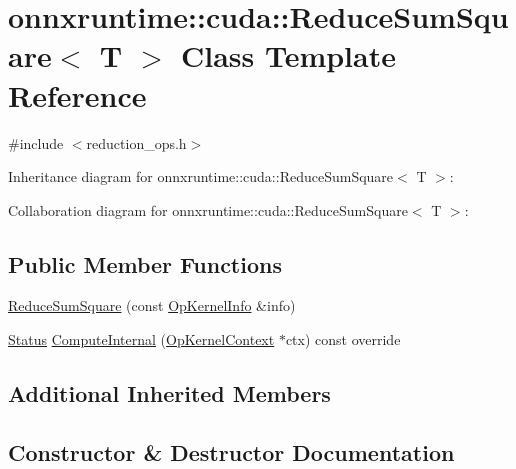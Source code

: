 \hypertarget{classonnxruntime_1_1cuda_1_1ReduceSumSquare}{}\section{onnxruntime\+:\+:cuda\+:\+:Reduce\+Sum\+Square$<$ T $>$ Class Template Reference}
\label{classonnxruntime_1_1cuda_1_1ReduceSumSquare}


{\ttfamily \#include $<$reduction\+\_\+ops.\+h$>$}



Inheritance diagram for onnxruntime\+:\+:cuda\+:\+:Reduce\+Sum\+Square$<$ T $>$\+:


Collaboration diagram for onnxruntime\+:\+:cuda\+:\+:Reduce\+Sum\+Square$<$ T $>$\+:
\subsection*{Public Member Functions}
\begin{DoxyCompactItemize}
\item 
\mbox{\hyperlink{classonnxruntime_1_1cuda_1_1ReduceSumSquare_abe184f29a870bc6466f8f57c4b3c2b54}{Reduce\+Sum\+Square}} (const \mbox{\hyperlink{classonnxruntime_1_1OpKernelInfo}{Op\+Kernel\+Info}} \&info)
\item 
\mbox{\hyperlink{classonnxruntime_1_1common_1_1Status}{Status}} \mbox{\hyperlink{classonnxruntime_1_1cuda_1_1ReduceSumSquare_ab6630541532a2665c0144113198c0c60}{Compute\+Internal}} (\mbox{\hyperlink{classonnxruntime_1_1OpKernelContext}{Op\+Kernel\+Context}} $\ast$ctx) const override
\end{DoxyCompactItemize}
\subsection*{Additional Inherited Members}


\subsection{Constructor \& Destructor Documentation}
\mbox{\label{classonnxruntime_1_1cuda_1_1ReduceSumSquare_abe184f29a870bc6466f8f57c4b3c2b54}} 
